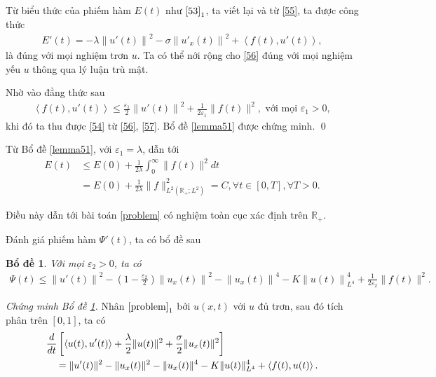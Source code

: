 \documentclass[12pt,a4paper]{article}
\def\R{\mathbb{R}}
\newtheorem{lemma}[theorem]{Bổ đề}[section]
\theoremstyle{definition}
\theoremstyle{definition}
\begin{document}
Từ biểu thức của phiếm hàm $E(t)$ như $\eqref{53}_1$, ta viết lại và từ \eqref{55}, ta được công thức
\begin{align} \label{56}
    E'(t) = -\lambda \left\|u'(t)\right\|^2 - \sigma \left\|u'_x(t)\right\|^2 + \left<f(t),u'(t)\right>,
\end{align}
là đúng với mọi nghiệm trơn $u$. Ta có thể nới rộng cho \eqref{56} đúng với mọi nghiệm yếu $u$ thông qua lý luận trù mật.

Nhờ vào đẳng thức sau
\begin{align} \label{57}
    \left<f(t),u'(t)\right> \le \frac{\varepsilon_1}{2} \left\|u'(t)\right\|^2 + \frac{1}{2\varepsilon_1} \|f(t)\|^2, \text{ với mọi } \varepsilon_1 > 0,
\end{align}
khi đó ta thu được \eqref{54} từ \eqref{56}, \eqref{57}. Bổ đề \ref{lemma51} được chứng minh. \qed

Từ Bổ đề \ref{lemma51}, với $\varepsilon_1 = \lambda$, dẫn tới
\begin{align*}
    E(t) &\le E(0) + \frac{1}{2\lambda} \int_0^\infty \|f(t)\|^2 dt \\
    &= E(0) + \frac{1}{2\lambda} \|f\|^2_{L^2(\R_+;L^2)} = C, \forall t \in [0,T], \forall T > 0.
\end{align*}

Điều này dẫn tới bài toán \eqref{problem} có nghiệm toàn cục xác định trên $\R_+$.

Đánh giá phiếm hàm $\Psi'(t)$, ta có bổ đề sau

\begin{lemma} \label{lemma52}
    Với mọi $\varepsilon_2 > 0$, ta có
    \begin{align}
        \Psi(t) \le \left\|u'(t)\right\|^2 - \left(1 - \frac{\varepsilon_2}{2}\right)\left\|u_x(t)\right\|^2 - \left\|u_x(t)\right\|^4 - K \left\|u(t)\right\|^4_{L^4} + \frac{1}{2\varepsilon_2}\|f(t)\|^2.
    \end{align}
\end{lemma}

\textit{Chứng minh Bổ đề \ref{lemma52}.} Nhân $\eqref{problem}_1$ bởi $u(x,t)$ với $u$ đủ trơn, sau đó tích phân trên $[0,1]$, ta có
\begin{align}
    &\frac{d}{dt} \left[ \left<u(t),u'(t)\right> + \frac{\lambda}{2}\|u(t)\|^2 + \frac{\sigma}{2} \|u_x(t)\|^2 \right] \\
    &\quad= \|u'(t)\|^2 - \|u_x(t)\|^2 - \|u_x(t)\|^4 - K\|u(t)\|^4_{L^4} + \left<f(t),u(t)\right>. \notag
\end{align}
\end{document}
